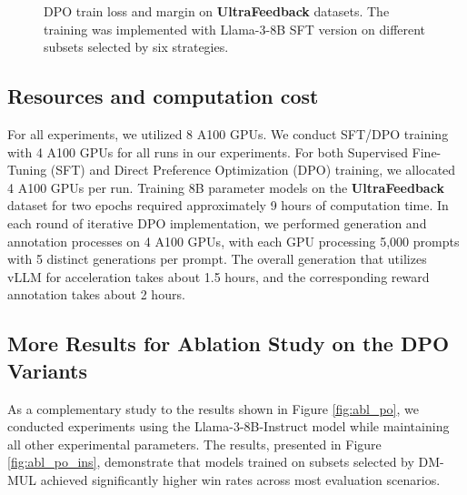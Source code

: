 \begin{figure*}[ht]
	\centering
        \vspace{-5pt}
        \vspace{-10pt}
	\caption{DPO train loss and margin on \textbf{UltraFeedback} datasets. The training was implemented with Llama-3-8B SFT version on different subsets selected by six strategies.
	}
	\label{fig:loss-margin-8b}
	\vspace{-15pt}
\end{figure*}

\subsection{Resources and computation cost}
\label{app:compute}
For all experiments, we utilized 8 A100 GPUs. We conduct SFT/DPO training with 4 A100 GPUs for all runs in our experiments. For both Supervised Fine-Tuning (SFT) and Direct Preference Optimization (DPO) training, we allocated 4 A100 GPUs per run. Training 8B parameter models on the \textbf{UltraFeedback} dataset for two epochs required approximately 9 hours of computation time. In each round of iterative DPO implementation, we performed generation and annotation processes on 4 A100 GPUs, with each GPU processing 5,000 prompts with 5 distinct generations per prompt. The overall generation that utilizes vLLM \citep{kwon2023efficient} for acceleration takes about 1.5 hours, and the corresponding reward annotation takes about 2 hours.

\subsection{More Results for Ablation Study on the DPO Variants}
\label{app:dpo-variant}

As a complementary study to the results shown in Figure \ref{fig:abl_po}, we conducted experiments using the Llama-3-8B-Instruct model while maintaining all other experimental parameters. The results, presented in Figure \ref{fig:abl_po_ins}, demonstrate that models trained on subsets selected by DM-MUL achieved significantly higher win rates across most evaluation scenarios.

